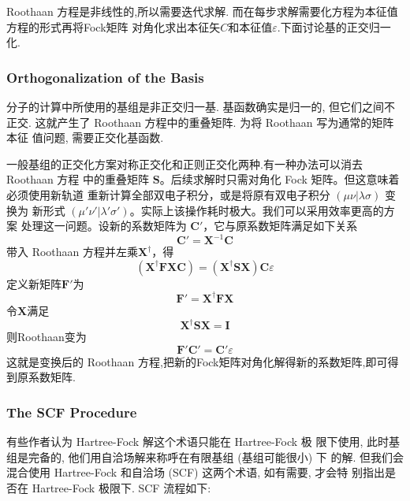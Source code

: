 \documentclass[fontset=none,12pt,a4paper]{ctexart}
\numberwithin{equation}{section}
\begin{document}
Roothaan 方程是非线性的,所以需要迭代求解. 而在每步求解需要化方程为本征值方程的形式再将Fock矩阵
对角化求出本征矢$C$和本征值$\varepsilon$.下面讨论基的正交归一化.
\subsubsection{Orthogonalization of the Basis}
分子的计算中所使用的基组是非正交归一基. 基函数确实是归一的, 但它们之间不 正交.
这就产生了 Roothaan 方程中的重叠矩阵. 为将 Roothaan 写为通常的矩阵本征 值问题, 
需要正交化基函数.

一般基组的正交化方案对称正交化和正则正交化两种.有一种办法可以消去 Roothaan 方程
中的重叠矩阵 $\mathbf{S}$。后续求解时只需对角化 Fock 矩阵。但这意味着必须使用新轨道
重新计算全部双电子积分，或是将原有双电子积分 $(\mu\nu|\lambda\sigma)$ 变换为
新形式 $(\mu'\nu'|\lambda'\sigma')$。实际上该操作耗时极大。我们可以采用效率更高的方案
处理这一问题。设新的系数矩阵为 $\mathbf{C}'$，它与原系数矩阵满足如下关系
\begin{equation}
  \mathbf{C}'=\mathbf{X}^{-1}\mathbf{C}
\end{equation}
带入 Roothaan 方程并左乘$\mathbf{X}^{\dagger}$，得
\begin{equation}
 (\mathbf{X}^{\dagger}\mathbf{F}\mathbf{X}\mathbf{C})=(\mathbf{X}^{\dagger}\mathbf{S}\mathbf{X})\mathbf{C}\varepsilon
\end{equation}
定义新矩阵$\mathbf{F}'$为
\begin{equation}
\mathbf{F}'=\mathbf{X}^{\dagger}\mathbf{F}\mathbf{X}
\end{equation}
令$\mathbf{X}$满足
\begin{equation}
  \mathbf{X}^{\dagger}\mathbf{S}\mathbf{X}=\mathbf{I}
\end{equation}
则Roothaan变为
\begin{equation}
  \mathbf{F}'\mathbf{C}'=\mathbf{C}'\varepsilon
\end{equation}
这就是变换后的 Roothaan 方程,把新的Fock矩阵对角化解得新的系数矩阵,即可得到原系数矩阵.
\subsubsection{The SCF Procedure}
有些作者认为 Hartree-Fock 解这个术语只能在 Hartree-Fock 极 限下使用, 此时基组是完备的, 
他们用自洽场解来称呼在有限基组 (基组可能很小) 下 的解. 但我们会混合使用 Hartree-Fock
和自洽场 (SCF) 这两个术语, 如有需要, 才会特 别指出是否在 Hartree-Fock 极限下. SCF 流程如下:
\end{document}
